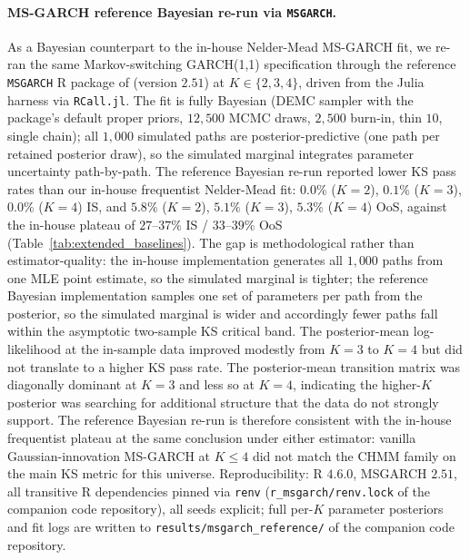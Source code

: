 \paragraph{MS-GARCH reference Bayesian re-run via \texttt{MSGARCH}.}
As a Bayesian counterpart to the in-house Nelder-Mead MS-GARCH fit, we re-ran the same Markov-switching GARCH(1,1) specification through the reference \texttt{MSGARCH} R package of \citet{ardia2019msgarch} (version $2.51$) at $K \in \{2, 3, 4\}$, driven from the Julia harness via \texttt{RCall.jl}. The fit is fully Bayesian (DEMC sampler with the package's default proper priors, $12{,}500$ MCMC draws, $2{,}500$ burn-in, thin $10$, single chain); all $1{,}000$ simulated paths are posterior-predictive (one path per retained posterior draw), so the simulated marginal integrates parameter uncertainty path-by-path. The reference Bayesian re-run reported lower KS pass rates than our in-house frequentist Nelder-Mead fit: $0.0\%$ ($K = 2$), $0.1\%$ ($K = 3$), $0.0\%$ ($K = 4$) IS, and $5.8\%$ ($K = 2$), $5.1\%$ ($K = 3$), $5.3\%$ ($K = 4$) OoS, against the in-house plateau of $27$--$37\%$ IS / $33$--$39\%$ OoS (Table~\ref{tab:extended_baselines}). The gap is methodological rather than estimator-quality: the in-house implementation generates all $1{,}000$ paths from one MLE point estimate, so the simulated marginal is tighter; the reference Bayesian implementation samples one set of parameters per path from the posterior, so the simulated marginal is wider and accordingly fewer paths fall within the asymptotic two-sample KS critical band. The posterior-mean log-likelihood at the in-sample data improved modestly from $K = 3$ to $K = 4$ but did not translate to a higher KS pass rate. The posterior-mean transition matrix was diagonally dominant at $K = 3$ and less so at $K = 4$, indicating the higher-$K$ posterior was searching for additional structure that the data do not strongly support. The reference Bayesian re-run is therefore consistent with the in-house frequentist plateau at the same conclusion under either estimator: vanilla Gaussian-innovation MS-GARCH at $K \le 4$ did not match the CHMM family on the main KS metric for this universe. Reproducibility: R $4.6.0$, MSGARCH $2.51$, all transitive R dependencies pinned via \texttt{renv} (\texttt{r\_msgarch/renv.lock} of the companion code repository), all seeds explicit; full per-$K$ parameter posteriors and fit logs are written to \texttt{results/msgarch\_reference/} of the companion code repository.

